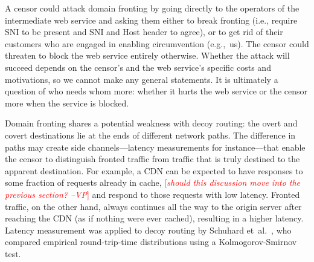 \documentclass{sig-alternate}
\newcommand{\note}[1]{{\textcolor{red}{[\textit{#1}]}}}
\newcommand{\vp}[1]{\note{#1 --VP}}
\begin{document}
A censor could attack domain fronting by
going directly to the operators of the intermediate web service
and asking them either to break fronting
(i.e., require SNI to be present and SNI and Host header to agree),
or to get rid of their customers who are
engaged in enabling circumvention (e.g.,~us).
The censor could threaten to block the web service entirely otherwise.
Whether the attack will succeed depends on the censor's
and the web service's specific costs and motivations,
so we cannot make any general statements.
It is ultimately a question of who needs whom more:
whether it hurts the web service or the censor more
when the service is blocked.



Domain fronting shares a potential weakness with decoy routing:
the overt and covert destinations lie at the ends of different
network paths.
The difference in paths may create side channels---latency measurements for instance---that
enable the censor to
distinguish fronted traffic from traffic that is truly destined
to the apparent destination.
For example, a CDN can be expected to have responses
to some fraction of requests already in cache,
\vp{should this discussion move into the previous section?}
and respond to those requests with low latency.
Fronted traffic, on the other hand, always continues all the way
to the origin server after reaching the CDN (as if nothing were ever cached),
resulting in a higher latency.
Latency measurement was applied to decoy routing by Schuhard et~al.~\cite[\S 5]{ccs2012-decoys},
who compared empirical round-trip-time distributions using a
Kolmogorov-Smirnov test.
\end{document}
